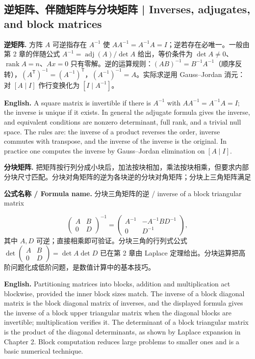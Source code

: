 \documentclass[UTF8,11pt,a4paper]{ctexart}
\newcommand{\EN}[1]{\par\noindent\textbf{English.} #1\par}
\newcommand{\FORMULA}[2]{\par\noindent\textbf{公式名称 / Formula name.} #1 / #2\par}
\begin{document}
\subsection{逆矩阵、伴随矩阵与分块矩阵 | Inverses, adjugates, and block matrices}
\noindent\textbf{逆矩阵.} 方阵 $A$ 可逆指存在 $A^{-1}$ 使 $AA^{-1}=A^{-1}A=I$；逆若存在必唯一。一般由第 2 章的伴随公式 $A^{-1}=\operatorname{adj}(A)/\det A$ 给出，等价条件为 $\det A\ne0$、$\operatorname{rank}A=n$、$Ax=0$ 只有零解。逆的运算规则：$(AB)^{-1}=B^{-1}A^{-1}$（顺序反转），$(A^{\mathsf T})^{-1}=(A^{-1})^{\mathsf T}$，$(A^{-1})^{-1}=A$。实际求逆用 Gauss--Jordan 消元：对 $[A\mid I]$ 作行变换化为 $[I\mid A^{-1}]$。
\EN{A square matrix is invertible if there is $A^{-1}$ with $AA^{-1}=A^{-1}A=I$; the inverse is unique if it exists. In general the adjugate formula gives the inverse, and equivalent conditions are nonzero determinant, full rank, and a trivial null space. The rules are: the inverse of a product reverses the order, inverse commutes with transpose, and the inverse of the inverse is the original. In practice one computes the inverse by Gauss--Jordan elimination on $[A\mid I]$.}
\noindent\textbf{分块矩阵.} 把矩阵按行列分成小块后，加法按块相加，乘法按块相乘，但要求内部分块尺寸匹配。分块对角矩阵的逆为各块逆的分块对角矩阵；分块上三角矩阵满足
\FORMULA{分块三角矩阵的逆}{inverse of a block triangular matrix}
\[
\begin{pmatrix}A&B\\0&D\end{pmatrix}^{-1}=
\begin{pmatrix}A^{-1}&-A^{-1}BD^{-1}\\0&D^{-1}\end{pmatrix},
\]
其中 $A,D$ 可逆；直接相乘即可验证。分块三角的行列式公式 $\det\begin{pmatrix}A&B\\0&D\end{pmatrix}=\det A\det D$ 已在第 2 章由 Laplace 定理给出。分块运算把高阶问题化成低阶问题，是数值计算中的基本技巧。
\EN{Partitioning matrices into blocks, addition and multiplication act blockwise, provided the inner block sizes match. The inverse of a block diagonal matrix is the block diagonal matrix of inverses, and the displayed formula gives the inverse of a block upper triangular matrix when the diagonal blocks are invertible; multiplication verifies it. The determinant of a block triangular matrix is the product of the diagonal determinants, as shown by Laplace expansion in Chapter 2. Block computation reduces large problems to smaller ones and is a basic numerical technique.}
\end{document}

